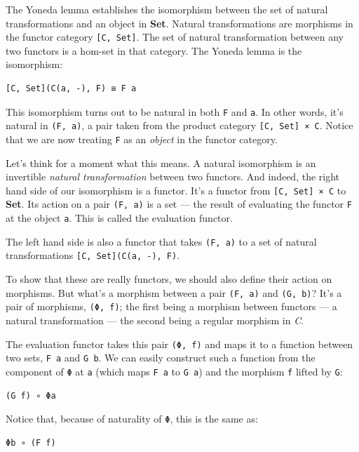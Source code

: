 The Yoneda lemma establishes the isomorphism between the set of natural
transformations and an object in \textbf{Set}. Natural transformations
are morphisms in the functor category \texttt{{[}C,\ Set{]}}. The set of
natural transformation between any two functors is a hom-set in that
category. The Yoneda lemma is the isomorphism:

\begin{verbatim}
[C, Set](C(a, -), F) ≅ F a
\end{verbatim}

This isomorphism turns out to be natural in both \texttt{F} and
\texttt{a}. In other words, it's natural in \texttt{(F,\ a)}, a pair
taken from the product category \texttt{{[}C,\ Set{]}\ ×\ C}. Notice
that we are now treating \texttt{F} as an \emph{object} in the functor
category.

Let's think for a moment what this means. A natural isomorphism is an
invertible \emph{natural transformation} between two functors. And
indeed, the right hand side of our isomorphism is a functor. It's a
functor from \texttt{{[}C,\ Set{]}\ ×\ C} to \textbf{Set}. Its action on
a pair \texttt{(F,\ a)} is a set --- the result of evaluating the
functor \texttt{F} at the object \texttt{a}. This is called the
evaluation functor.

The left hand side is also a functor that takes \texttt{(F,\ a)} to a
set of natural transformations \texttt{{[}C,\ Set{]}(C(a,\ -),\ F)}.

To show that these are really functors, we should also define their
action on morphisms. But what's a morphism between a pair
\texttt{(F,\ a)} and \texttt{(G,\ b)}? It's a pair of morphisms,
\texttt{(Φ,\ f)}; the first being a morphism between functors --- a
natural transformation --- the second being a regular morphism in
\emph{C}.

The evaluation functor takes this pair \texttt{(Φ,\ f)} and maps it to a
function between two sets, \texttt{F\ a} and \texttt{G\ b}. We can
easily construct such a function from the component of \texttt{Φ} at
\texttt{a} (which maps \texttt{F\ a} to \texttt{G\ a}) and the morphism
\texttt{f} lifted by \texttt{G}:

\begin{verbatim}
(G f) ∘ Φa
\end{verbatim}

Notice that, because of naturality of \texttt{Φ}, this is the same as:

\begin{verbatim}
Φb ∘ (F f)
\end{verbatim}

